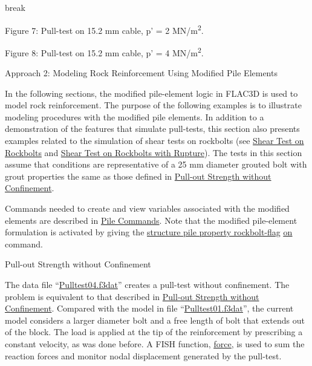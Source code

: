 \documentclass[a4paper, nobind]{templates/ociamthesis}
\begin{document}
break

Figure 7: Pull-test on 15.2 mm cable, p'
= 2 MN/m\textsuperscript{2}.

Figure 8: Pull-test on 15.2 mm cable, p'
= 4 MN/m\textsuperscript{2}.

Approach 2: Modeling Rock Reinforcement Using Modified Pile
Elements

In the following sections, the modified pile-element logic in FLAC3D is
used to model rock reinforcement. The purpose of
the following examples is to illustrate modeling procedures with the
modified
pile elements. In addition to a demonstration of the features that
simulate
pull-tests, this section also presents examples related to the
simulation of
shear tests on rockbolts (see \protect\hyperlink{pulltest-shear-bolt-section}{Shear Test on
Rockbolts} and
\protect\hyperlink{pulltest-shear-rupture-section}{Shear
Test on Rockbolts with Rupture}). The
tests in this section assume
that conditions are representative of a 25 mm diameter grouted bolt with
grout
properties the same as those defined in \protect\hyperlink{pulltest-cable1-section}{Pull-out Strength without
Confinement}.

Commands needed to create and view variables associated with the
modified
elements are described in \href{../../../../sel/doc/manual/sel_manual/piles/commands/pile_commands.html\#sel-pile-commands}{Pile
Commands}.
Note that the modified pile-element formulation is
activated by giving the \href{../../../../sel/doc/manual/sel_manual/piles/commands/cmd_structure.pile.property.html\#kwd:structure.pile.property.rockbolt-flag}{structure
pile property
rockbolt-flag}
\href{../../../../../common/docproject/utilities/types.html\#type:str}{\underline{on}}
command.

Pull-out Strength without
Confinement

The data file ``\protect\hyperlink{pulltest04data}{Pulltest04.f3dat}'' creates a pull-test
without confinement. The problem is equivalent to that described in
\protect\hyperlink{pulltest-cable1-section}{Pull-out
Strength without Confinement}. Compared with
the model in file ``\protect\hyperlink{pulltest01data}{Pulltest01.f3dat}'', the current
model
considers a larger diameter bolt and a free length of bolt that extends
out of
the block. The load is applied at the tip of the reinforcement by
prescribing a
constant velocity, as was done before. A FISH
function,
\href{../../../../../common/docproject/utilities/types.html\#type:sym}{\underline{force}},
is used to sum the
reaction forces and monitor nodal displacement generated by the
pull-test.
\end{document}

